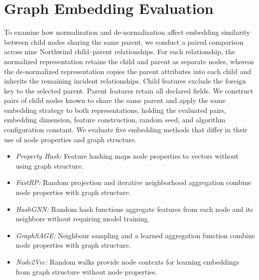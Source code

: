 \documentclass[sigconf]{acmart}
\begin{document}
\section{Graph Embedding Evaluation}


To examine how normalization and de-normalization affect embedding
similarity between child nodes sharing the same parent, we conduct a
paired comparison across nine Northwind child--parent relationships.
For each relationship, the normalized representation retains the child and
parent as separate nodes, whereas the de-normalized representation copies
the parent attributes into each child and inherits the remaining incident relationships.
Child features exclude the foreign key to the selected parent. Parent features retain
all declared fields. We construct pairs of child nodes known to share the same
parent and apply the same embedding strategy to both representations, holding
the evaluated pairs, embedding dimension, feature construction, random seed,
and algorithm configuration constant. We evaluate five embedding methods that
differ in their use of node properties and graph structure.


\begin{itemize}[nosep,leftmargin=*]
    \item \textit{Property Hash:} Feature hashing maps node properties to
    vectors without using graph structure.

    \item \textit{FastRP:} Random projection and iterative neighborhood
    aggregation combine node properties with graph structure.

    \item \textit{HashGNN:} Random hash functions aggregate features from
    each node and its neighbors without requiring model training.

    \item \textit{GraphSAGE:} Neighbour sampling and a learned aggregation
    function combine node properties with graph structure.

    \item \textit{Node2Vec:} Random walks provide node contexts for learning
    embeddings from graph structure without node properties.
\end{itemize}
\end{document}
